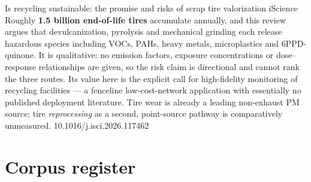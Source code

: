 \documentclass[10pt]{article}
\begin{document}

{Is recycling sustainable: the promise and risks of scrap tire valorization}
{iScience}
{Roughly \textbf{1.5 billion end-of-life tires} accumulate annually, and this review argues
that devulcanization, pyrolysis and mechanical grinding each release hazardous species
including VOCs, PAHs, heavy metals, microplastics and 6PPD-quinone. It is qualitative:
no emission factors, exposure concentrations or dose--response relationships are given, so
the risk claim is directional and cannot rank the three routes. Its value here is the
explicit call for high-fidelity monitoring of recycling facilities --- a fenceline
low-cost-network application with essentially no published deployment literature. Tire
wear is already a leading non-exhaust PM source; tire \emph{reprocessing} as a second,
point-source pathway is comparatively unmeasured.}
{10.1016/j.isci.2026.117462}

\clearpage

\section*{\sffamily\bfseries\color{Deep}Corpus register}
\vspace{-1.5mm}{\color{Amber}\rule{\linewidth}{1.1pt}}\vspace{2.5mm}


\end{document}
